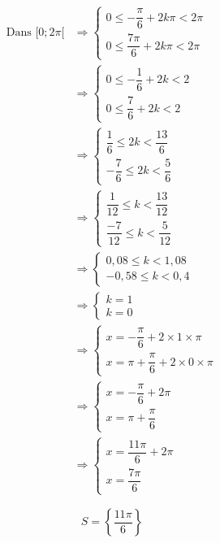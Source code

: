\documentclass[a4paper,12pt]{article}
\begin{document}
\[
\begin{aligned}
\text{Dans } [0 ; 2\pi[ &\Rightarrow
\begin{cases}
0 \leq -\dfrac{\pi}{6} + 2k\pi < 2\pi \\
0 \leq \dfrac{7\pi}{6} + 2k\pi < 2\pi
\end{cases}\\[1em]
&\Rightarrow
\begin{cases}
0 \leq -\dfrac{1}{6} + 2k < 2 \\
0 \leq \dfrac{7}{6} + 2k < 2
\end{cases}\\[1em]
&\Rightarrow
\begin{cases}
\dfrac{1}{6} \leq 2k < \dfrac{13}{6} \\
-\dfrac{7}{6} \leq 2k < \dfrac{5}{6}
\end{cases}\\[1em]
&\Rightarrow
\begin{cases}
\dfrac{1}{12} \leq k < \dfrac{13}{12} \\[1em]
\dfrac{-7}{12} \leq k < \dfrac{5}{12}
\end{cases}\\[1em]
&\Rightarrow
\begin{cases}
0,08 \leq k < 1,08 \\[1em]
-0,58 \leq k < 0,4
\end{cases}\\[1em]
&\Rightarrow
\begin{cases}
k=1 \\[1em]
k=0
\end{cases}\\[1em]
&\Rightarrow
\begin{cases}
x = -\dfrac{\pi}{6} + 2\times 1 \times\pi \\
x = \pi + \dfrac{\pi}{6} + 2\times 0 \times\pi
\end{cases}\\[1em]
&\Rightarrow
\begin{cases}
x = -\dfrac{\pi}{6} + 2\pi \\
x = \pi + \dfrac{\pi}{6}
\end{cases}\\[1em]
&\Rightarrow
\begin{cases}
x = \dfrac{11\pi}{6} + 2\pi \\
x = \dfrac{7\pi}{6}
\end{cases}
\end{aligned}
\]

\[
\boxed{S = \left\{ \dfrac{11\pi}{6} \right\}}
\]
\end{document}
